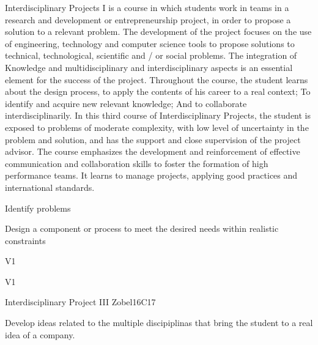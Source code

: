 \begin{syllabus}


\begin{justification}
Interdisciplinary Projects I is a course in which students work in teams in a research and development or entrepreneurship project, in order to propose a solution to a relevant problem. The development of the project focuses on the use of engineering, technology and computer science tools to propose solutions to technical, technological, scientific and / or social problems. The integration of
Knowledge and multidisciplinary and interdisciplinary aspects is an essential element for the success of the project. Throughout the course, the student learns about the design process, to apply the contents of his career to a real context; To identify and acquire new relevant knowledge; And to collaborate interdisciplinarily. In this third course of Interdisciplinary Projects, the student is exposed to problems of moderate complexity, with low level of uncertainty in the problem and solution, and has the support and close supervision of the project advisor. The course emphasizes the development and reinforcement of effective communication and collaboration skills to foster the formation of high performance teams. 
It learns to manage projects, applying good practices and international standards.
\end{justification}

\begin{goals}
   \item Identify problems
   \item Design a component or process to meet the desired needs within realistic constraints
   
\end{goals}

\begin{outcomes}{V1}
   \item {}
   \item {}
\end{outcomes}

\begin{competences}{V1}
    \item {}
    \item {}
\end{competences}

\begin{unit}{Interdisciplinary Project  III }{}{Zobel}{16}{C17}
\begin{topics}
      \item Develop ideas related to the multiple discipiplinas that bring the student to a real idea of a company.
\end{topics}


\end{unit}
\end{syllabus}
